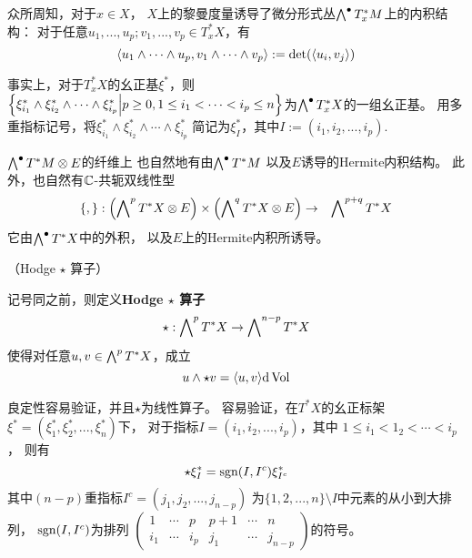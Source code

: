众所周知，对于$x\in X$，
$X$上的黎曼度量诱导了微分形式丛$\bigwedge\nolimits^{\bullet}T^*_xM$上的内积结构：
对于任意$u_1,...,u_p;v_1,...,v_p\in T^*_xX$，有
$$
  \langle u_1\wedge\cdots\wedge u_p,v_1\wedge\cdots\wedge v_p \rangle
:=
  \det(\langle u_i,v_j\rangle)
$$


事实上，对于$T^*_xX$的幺正基$\xi^*$，则
$
  \Big\{ \xi_{i_1}^*\wedge\xi_{i_2}^*\wedge\cdots\wedge\xi_{i_p}^* \Big| p\geq 0,1\leq i_1<\cdots<i_p\leq n \Big\}
$为$\bigwedge\nolimits^{\bullet}T^*_xX$的一组幺正基。
用多重指标记号，将$\xi_{i_1}^*\wedge\xi_{i_2}^*\wedge\cdots\wedge\xi_{i_p}^*$
简记为$\xi_I^*$，其中$I:=(i_1,i_2,...,i_p)$.

$\bigwedge\nolimits^{\bullet}T^*M\otimes E$的纤维上
也自然地有由$\bigwedge\nolimits^{\bullet}T^*M$
以及$E$诱导的Hermite内积结构。
此外，也自然有$\mathbb{C}$-共轭双线性型
\begin{eqnarray*}
  \{ , \}:
  \left(
  \bigwedge\nolimits^{p}T^*X\otimes E\right)
  \times
  \left(
  \bigwedge\nolimits^{q}T^*X\otimes E\right)
  &\to&
  \bigwedge\nolimits^{p+q}T^*X
\end{eqnarray*}
它由$\bigwedge\nolimits^{\bullet}T^*X$中的外积，
以及$E$上的Hermite内积所诱导。

\begin{definition}（Hodge $\star$ 算子）

记号同之前，则定义\textbf{Hodge $\star$ 算子}
$$\star:\bigwedge\nolimits^{p}T^*X\to\bigwedge\nolimits^{n-p}T^*X$$
使得对任意$u,v\in \bigwedge\nolimits^{p}T^*X$，成立%
$$u\wedge\star v=\langle u,v \rangle\mathrm{d}\operatorname{Vol}$$
\end{definition}

良定性容易验证，并且$\star$为线性算子。
容易验证，在$T^*X$的幺正标架$\xi^*=(\xi^*_1,\xi^*_2,...,\xi^*_n)$下，
对于指标$I=(i_1,i_2,...,i_p)$，其中
$1\leq i_1<1_2<\cdots<i_p$，
则有
$$\star\xi^*_I=\operatorname{sgn}(I,I^c)\xi^*_{I^c}$$
其中$(n-p)$重指标$I^c=(j_1,j_2,...,j_{n-p})$
为$\{1,2,...,n\}\setminus I$中元素的从小到大排列，
$\operatorname{sgn}(I,I^c)$为排列
$
  \begin{pmatrix}
    1 & \cdots & p & p+1 & \cdots & n \\
    i_1 & \cdots & i_p & j_1 & \cdots & j_{n-p}
  \end{pmatrix}
$的符号。

